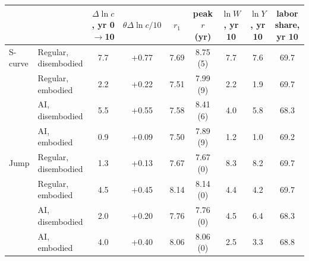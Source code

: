 \begin{tabular}{llccccccc}\toprule
 & & $\Delta\ln c$, yr 0$\to$10 & $\theta\Delta\ln c/10$ & $r_1$ & peak $r$ (yr) & $\ln W$, yr 10 & $\ln Y$, yr 10 & labor share, yr 10\\\midrule
S-curve & Regular, disembodied & 7.7 & +0.77 & 7.69 & 8.75 (5) & 7.7 & 7.6 & 69.7\\
 & Regular, embodied & 2.2 & +0.22 & 7.51 & 7.99 (9) & 2.2 & 1.9 & 69.7\\
 & AI, disembodied & 5.5 & +0.55 & 7.58 & 8.41 (6) & 4.0 & 5.8 & 68.3\\
 & AI, embodied & 0.9 & +0.09 & 7.50 & 7.89 (9) & 1.2 & 1.0 & 69.2\\
\midrule
Jump & Regular, disembodied & 1.3 & +0.13 & 7.67 & 7.67 (0) & 8.3 & 8.2 & 69.7\\
 & Regular, embodied & 4.5 & +0.45 & 8.14 & 8.14 (0) & 4.4 & 4.2 & 69.7\\
 & AI, disembodied & 2.0 & +0.20 & 7.76 & 7.76 (0) & 4.5 & 6.4 & 68.3\\
 & AI, embodied & 4.0 & +0.40 & 8.06 & 8.06 (0) & 2.5 & 3.3 & 68.8\\
\bottomrule\end{tabular}
